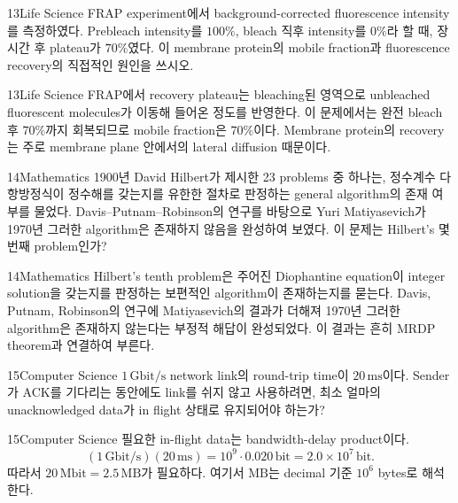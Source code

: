 \documentclass[12pt,aspectratio=169]{beamer}
\begin{document}
\begin{problemframe}{13}{Life Science}
FRAP experiment에서 background-corrected fluorescence intensity를 측정하였다. Prebleach intensity를 $100\%$, bleach 직후 intensity를 $0\%$라 할 때, 장시간 후 plateau가 $70\%$였다. 이 membrane protein의 mobile fraction과 fluorescence recovery의 직접적인 원인을 쓰시오.
\end{problemframe}

\begin{solutionframe}{13}{Life Science}
FRAP에서 recovery plateau는 bleaching된 영역으로 unbleached fluorescent molecules가 이동해 들어온 정도를 반영한다. 이 문제에서는 완전 bleach 후 $70\%$까지 회복되므로 mobile fraction은 $70\%$이다. Membrane protein의 recovery는 주로 membrane plane 안에서의 lateral diffusion 때문이다.
\end{solutionframe}

\begin{problemframe}{14}{Mathematics}
1900년 David Hilbert가 제시한 23 problems 중 하나는, 정수계수 다항방정식이 정수해를 갖는지를 유한한 절차로 판정하는 general algorithm의 존재 여부를 물었다. Davis--Putnam--Robinson의 연구를 바탕으로 Yuri Matiyasevich가 1970년 그러한 algorithm은 존재하지 않음을 완성하여 보였다. 이 문제는 Hilbert's 몇 번째 problem인가?
\end{problemframe}

\begin{solutionframe}{14}{Mathematics}
Hilbert's tenth problem은 주어진 Diophantine equation이 integer solution을 갖는지를 판정하는 보편적인 algorithm이 존재하는지를 묻는다. Davis, Putnam, Robinson의 연구에 Matiyasevich의 결과가 더해져 1970년 그러한 algorithm은 존재하지 않는다는 부정적 해답이 완성되었다. 이 결과는 흔히 MRDP theorem과 연결하여 부른다.
\end{solutionframe}

\begin{problemframe}{15}{Computer Science}
$1\,\mathrm{Gbit/s}$ network link의 round-trip time이 $20\,\mathrm{ms}$이다. Sender가 ACK를 기다리는 동안에도 link를 쉬지 않고 사용하려면, 최소 얼마의 unacknowledged data가 in flight 상태로 유지되어야 하는가?
\end{problemframe}

\begin{solutionframe}{15}{Computer Science}
필요한 in-flight data는 bandwidth-delay product이다.
\[
(1\,\mathrm{Gbit/s})(20\,\mathrm{ms})
=10^9\cdot 0.020\,\mathrm{bit}=2.0\times10^7\,\mathrm{bit}.
\]
따라서 $20\,\mathrm{Mbit}=2.5\,\mathrm{MB}$가 필요하다. 여기서 $\mathrm{MB}$는 decimal 기준 $10^6$ bytes로 해석한다.
\end{solutionframe}
\end{document}
